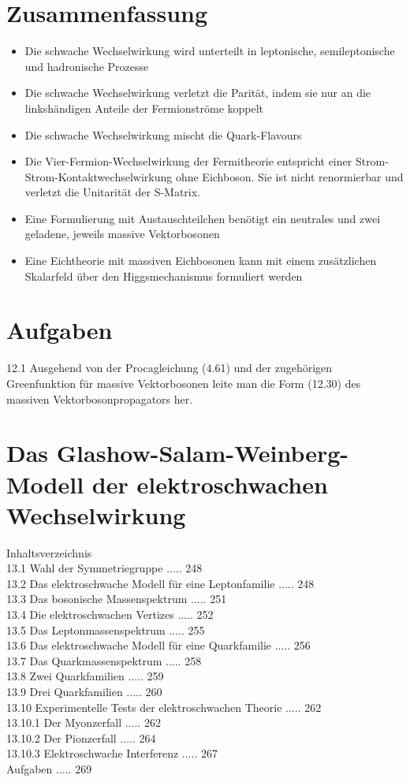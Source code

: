 \documentclass[10pt, letterpaper]{article}
\begin{document}
\section*{Zusammenfassung}
\begin{itemize}
  \item Die schwache Wechselwirkung wird unterteilt in leptonische, semileptonische und hadronische Prozesse
  \item Die schwache Wechselwirkung verletzt die Parität, indem sie nur an die linkshändigen Anteile der Fermionströme koppelt
  \item Die schwache Wechselwirkung mischt die Quark-Flavours
  \item Die Vier-Fermion-Wechselwirkung der Fermitheorie entspricht einer Strom-Strom-Kontaktwechselwirkung ohne Eichboson. Sie ist nicht renormierbar und verletzt die Unitarität der S-Matrix.
  \item Eine Formulierung mit Austauschteilchen benötigt ein neutrales und zwei geladene, jeweils massive Vektorbosonen
  \item Eine Eichtheorie mit massiven Eichbosonen kann mit einem zusätzlichen Skalarfeld über den Higgsmechanismus formuliert werden
\end{itemize}

\section*{Aufgaben}
12.1 Ausgehend von der Procagleichung (4.61) und der zugehörigen Greenfunktion für massive Vektorbosonen leite man die Form (12.30) des massiven Vektorbosonpropagators her.

\section*{Das Glashow-Salam-Weinberg-Modell der elektroschwachen Wechselwirkung }
Inhaltsverzeichnis\\
13.1 Wahl der Symmetriegruppe ..... 248\\
13.2 Das elektroschwache Modell für eine Leptonfamilie ..... 248\\
13.3 Das bosonische Massenspektrum ..... 251\\
13.4 Die elektroschwachen Vertizes ..... 252\\
13.5 Das Leptonmassenspektrum ..... 255\\
13.6 Das elektroschwache Modell für eine Quarkfamilie ..... 256\\
13.7 Das Quarkmassenspektrum ..... 258\\
13.8 Zwei Quarkfamilien ..... 259\\
13.9 Drei Quarkfamilien ..... 260\\
13.10 Experimentelle Tests der elektroschwachen Theorie ..... 262\\
13.10.1 Der Myonzerfall ..... 262\\
13.10.2 Der Pionzerfall ..... 264\\
13.10.3 Elektroschwache Interferenz ..... 267\\
Aufgaben ..... 269
\end{document}
